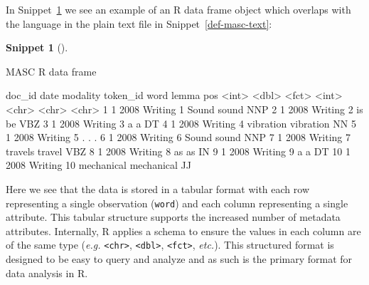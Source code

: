 \documentclass[
  letterpaper,
  krantz1]{latex/krantz-mod}
\newenvironment{Shaded}{\begin{snugshade}}{\end{snugshade}}
\newcommand{\KeywordTok}[1]{\textcolor[rgb]{0.00,0.00,0.00}{#1}}
\newcommand{\NormalTok}[1]{\textcolor[rgb]{0.00,0.00,0.00}{#1}}
\theoremstyle{definition}
\newtheorem{definition}{Snippet}[chapter]
\theoremstyle{definition}
\theoremstyle{remark}
\begin{document}
In Snippet~\ref{def-masc-df} we see an example of an R data
frame object which overlaps with the language in the
plain text file in Snippet~\ref{def-masc-text}:

\begin{definition}[]\protect\hypertarget{def-masc-df}{}\label{def-masc-df}

MASC R data frame

\begin{Shaded}
\begin{Highlighting}[]
\NormalTok{   doc\_id  date modality token\_id word       lemma      pos}
\NormalTok{    \textless{}}\KeywordTok{int}\NormalTok{\textgreater{} \textless{}}\KeywordTok{dbl}\NormalTok{\textgreater{} \textless{}}\KeywordTok{fct}\NormalTok{\textgreater{}       \textless{}}\KeywordTok{int}\NormalTok{\textgreater{} \textless{}}\KeywordTok{chr}\NormalTok{\textgreater{}      \textless{}}\KeywordTok{chr}\NormalTok{\textgreater{}      \textless{}}\KeywordTok{chr}\NormalTok{\textgreater{}}
\NormalTok{ 1      1  2008 Writing         1 Sound      sound      NNP}
\NormalTok{ 2      1  2008 Writing         2 is         be         VBZ}
\NormalTok{ 3      1  2008 Writing         3 a          a          DT}
\NormalTok{ 4      1  2008 Writing         4 vibration  vibration  NN}
\NormalTok{ 5      1  2008 Writing         5 .          .          .}
\NormalTok{ 6      1  2008 Writing         6 Sound      sound      NNP}
\NormalTok{ 7      1  2008 Writing         7 travels    travel     VBZ}
\NormalTok{ 8      1  2008 Writing         8 as         as         IN}
\NormalTok{ 9      1  2008 Writing         9 a          a          DT}
\NormalTok{10      1  2008 Writing        10 mechanical mechanical JJ}
\end{Highlighting}
\end{Shaded}

\end{definition}

Here we see that the data is stored in a tabular format with each row
representing a single observation (\texttt{word})
and each column representing a single attribute. This
tabular structure supports the increased number of metadata attributes.
Internally, R applies a schema to ensure the values in each column are
of the same type (\emph{e.g.}
\texttt{\textless{}chr\textgreater{}},
\texttt{\textless{}dbl\textgreater{}},
\texttt{\textless{}fct\textgreater{}}, \emph{etc.}). This structured
format is designed to be easy to query and analyze and as such is the
primary format for data analysis in R.
\end{document}
